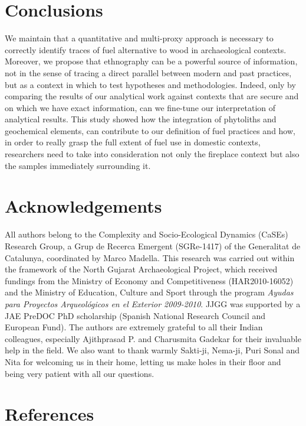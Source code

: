 \documentclass[authoryear,preprint,review,12pt]{elsarticle}
\begin{document}
\section{Conclusions}
\label{sec:5}
We maintain that a quantitative and multi-proxy approach is necessary to correctly identify traces of fuel alternative to wood in archaeological contexts. Moreover, we propose that ethnography can be a powerful source of information, not in the sense of tracing a direct parallel between modern and past practices, but as a context in which to test hypotheses and methodologies. Indeed, only by comparing the results of our analytical work against contexts that are secure and on which we have exact information, can we fine-tune our interpretation of analytical results. This study showed how the integration of phytoliths and geochemical elements, can contribute to our definition of fuel practices and how, in order to really grasp the full extent of fuel use in domestic contexts, researchers need to take into consideration not only the fireplace context but also the samples immediately surrounding it.

\section{Acknowledgements}
\label{sec:acknowledgements}
All authors belong to the Complexity and Socio-Ecological Dynamics (CaSEs) Research Group, a Grup de Recerca Emergent (SGRe-1417) of the Generalitat de Catalunya, coordinated by Marco Madella. This research was carried out within the framework of the North Gujarat Archaeological Project, which received fundings from the Ministry of Economy and Competitiveness (HAR2010-16052) and the Ministry of Education, Culture and Sport through the program \textit{Ayudas para Proyectos Arqueológicos en el Exterior 2009-2010}. JJGG was supported by a JAE PreDOC PhD scholarship (Spanish National Research Council and European Fund). The authors are extremely grateful to all their Indian colleagues, especially Ajithprasad P. and Charusmita Gadekar for their invaluable help in the field. We also want to thank warmly Sakti-ji, Nema-ji, Puri Sonal and Nita for welcoming us in their home, letting us make holes in their floor and being very patient with all our questions.

\section{References}




\end{document}
